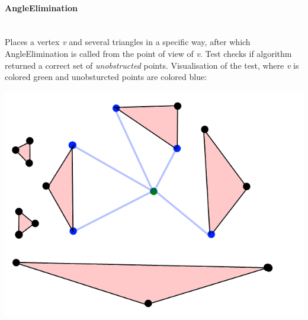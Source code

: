 \documentclass[a4paper,12pt]{article}
\begin{document}
\paragraph{\large AngleElimination} \hspace{0pt} \\
Places a vertex \emph{v} and several triangles in a specific way, after which\\ AngleElimination is called from the point of view of \emph{v}. Test checks if algorithm returned a correct set of \emph{unobstructed} points. Visualisation of the test, where \emph{v} is colored green and unobsturcted points are colored blue:\\
\centerline{\includegraphics[scale=0.5]{ae.png}} \hspace*{\fill} \\
\end{document}
